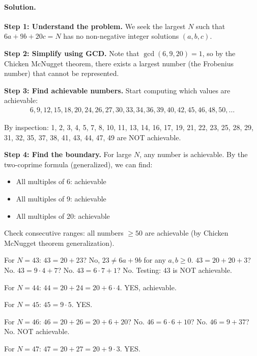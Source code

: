 \documentclass[12pt]{extarticle}
\begin{document}
\paragraph{Solution.}
\textbf{Step 1: Understand the problem.} We seek the largest $N$ such that $6a + 9b + 20c = N$ has no non-negative integer solutions $(a, b, c)$.

\textbf{Step 2: Simplify using GCD.} Note that $\gcd(6, 9, 20) = 1$, so by the Chicken McNugget theorem, there exists a largest number (the Frobenius number) that cannot be represented.

\textbf{Step 3: Find achievable numbers.} Start computing which values are achievable:
\begin{align*}
6, 9, 12, 15, 18, 20, 24, 26, 27, 30, 33, 34, 36, 39, 40, 42, 45, 46, 48, 50, \ldots
\end{align*}

By inspection: 1, 2, 3, 4, 5, 7, 8, 10, 11, 13, 14, 16, 17, 19, 21, 22, 23, 25, 28, 29, 31, 32, 35, 37, 38, 41, 43, 44, 47, 49 are NOT achievable.

\textbf{Step 4: Find the boundary.} For large $N$, any number is achievable. By the two-coprime formula (generalized), we can find:
\begin{itemize}
    \item All multiples of 6: achievable
    \item All multiples of 9: achievable
    \item All multiples of 20: achievable
\end{itemize}

Check consecutive ranges: all numbers $\ge 50$ are achievable (by Chicken McNugget theorem generalization).

\medskip

For $N = 43$: 
$43 = 20 + 23$? No, $23 \ne 6a + 9b$ for any $a, b \ge 0$. 
$43 = 20 + 20 + 3$? No. 
$43 = 9 \cdot 4 + 7$? No. 
$43 = 6 \cdot 7 + 1$? No.
Testing: $43$ is NOT achievable.

\medskip

For $N = 44$: 
$44 = 20 + 24 = 20 + 6 \cdot 4$. YES, achievable.

\medskip

For $N = 45$: 
$45 = 9 \cdot 5$. YES.

\medskip

For $N = 46$: 
$46 = 20 + 26 = 20 + 6 + 20$? No. 
$46 = 6 \cdot 6 + 10$? No. 
$46 = 9 + 37$? No. 
NOT achievable.

\medskip

For $N = 47$: 
$47 = 20 + 27 = 20 + 9 \cdot 3$. YES.
\end{document}

